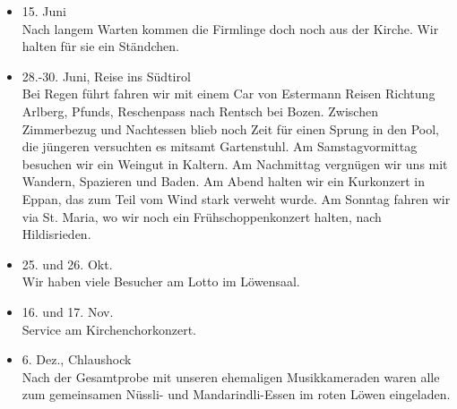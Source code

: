 \begin{history}
\begin{itemize}
        \item 15. Juni\\
              Nach langem Warten kommen die Firmlinge doch noch aus der Kirche. Wir
              halten für sie ein Ständchen.

        \item 28.-30. Juni, Reise ins Südtirol\\
              Bei Regen führt fahren wir mit einem Car von
              Estermann Reisen Richtung Arlberg, Pfunds, Reschenpass nach Rentsch bei
              Bozen. Zwischen Zimmerbezug und Nachtessen blieb noch Zeit für einen
              Sprung in den Pool, die jüngeren versuchten es mitsamt Gartenstuhl.
              Am Samstagvormittag besuchen wir ein Weingut in
              Kaltern. Am Nachmittag vergnügen wir uns mit Wandern, Spazieren und
              Baden. Am Abend halten wir ein Kurkonzert in Eppan, das zum Teil vom
              Wind stark verweht wurde. Am Sonntag fahren wir via St. Maria, wo wir
              noch ein Frühschoppenkonzert halten, nach Hildisrieden.

        \item 25. und 26. Okt.\\
              Wir haben viele Besucher am Lotto im Löwensaal.

        \item 16. und 17. Nov.\\
              Service am Kirchenchorkonzert.

        \item 6. Dez., Chlaushock\\
              Nach der Gesamtprobe mit unseren ehemaligen Musikkameraden
              waren alle zum gemeinsamen Nüssli- und Mandarindli-Essen im roten Löwen
              eingeladen.


    \end{itemize}

\end{history}
